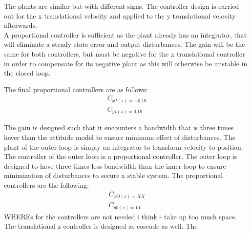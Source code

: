 \begin{where}
\end{where}
The plants are similar but with different signs. The controller design is carried out for the x translational velocity and applied to the y translational velocity afterwards.\\
A proportional controller is sufficient as the plant already has an integrator, that will eliminate a steady state error and output disturbances. The gain will be the same for both controllers, but must be negative for the x translational controller in order to compensate for its negative plant as this will otherwise be unstable in the closed loop.

The final proportional controllers are as follows:
\begin{align}
C_{\dot{x}I(s)= -0.19}\\
C_{\dot{y}I(s)= 0.19}
\end{align}
\begin{where}
\end{where}
The gain is designed such that it encounters a bandwidth that is three times lower than the attitude model to ensure minimum effect of disturbances.
The plant of the outer loop is simply an integrator to transform velocity to position. The controller of the outer loop is a proportional controller. The outer loop is designed to have three times less bandwidth than the inner loop to ensure minimization of disturbances to secure a stable system.
The proportional controllers are the following:
\begin{align}
C_{\dot{x}O(s)= XX}\\
C_{\dot{y}0(s)= YY}
\end{align}
WHEREs for the controllers are not needed i think - take up too much space. 
The translational z controller is designed as cascade as well. The 


